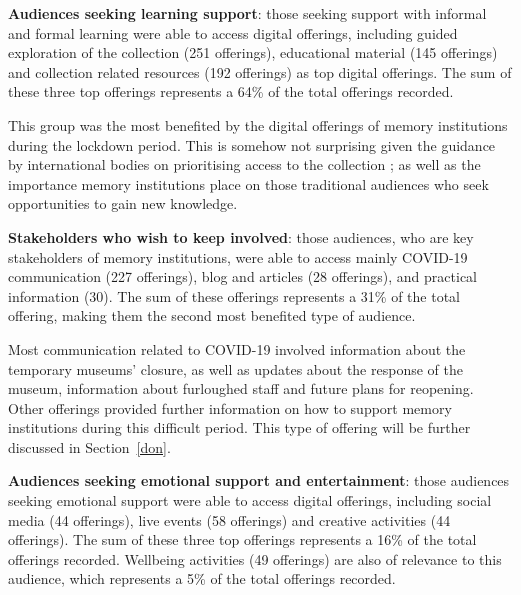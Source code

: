 \documentclass{egpubl}
\begin{document}
\noindent \textbf{Audiences seeking learning support}: those seeking support with informal and formal learning were able to access digital offerings, including guided exploration of the collection (251 offerings), educational material (145 offerings) and collection related resources (192 offerings) as top digital offerings. The sum of these three top offerings represents a 64\% of the total offerings recorded. 

This group was the most benefited by the digital offerings of memory institutions during the lockdown period. This is somehow not surprising given the guidance by international bodies on prioritising access to the collection \cite{InternationalCouncilofMuseums2020}; as well as the importance memory institutions place on those traditional audiences who seek opportunities to gain new knowledge. 



\noindent \textbf{Stakeholders who wish to keep involved}: those audiences, who are key stakeholders of memory institutions, were able to access mainly COVID-19 communication (227 offerings), blog and articles (28 offerings), and practical information (30). The sum of these offerings represents a 31\% of the total offering, making them the second most benefited type of audience. 

Most communication related to COVID-19 involved information about the temporary museums' closure, as well as updates about the response of the museum, information about furloughed staff and future plans for reopening. Other offerings provided further information on how to support memory institutions during this difficult period. This type of offering will be further discussed in Section~\ref{don}.

\noindent \textbf{Audiences seeking emotional support and entertainment}: those audiences seeking emotional support were able to access digital offerings, including social media (44 offerings), live events (58 offerings) and creative activities (44 offerings). The sum of these three top offerings represents a 16\% of the total offerings recorded. Wellbeing activities (49 offerings) are also of relevance to this audience, which represents a 5\% of the total offerings recorded. 
\end{document}
